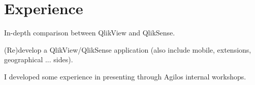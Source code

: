 \documentclass[letterpaper]{my-resume} %
\begin{document}
\hfill
%
%
\begin{minipage}[t]{0.66\textwidth} %


\section{Experience}

\vspace{\topsep} %
\begin{tightitemize}
\item In-depth comparison between QlikView and QlikSense.
\item (Re)develop a QlikView/QlikSense application (also include mobile, extensions, geographical ... sides).
\item I developed some experience in presenting through Agilos internal workshops.
\end{tightitemize}

\sectionspace %



\end{minipage}
\end{document}
